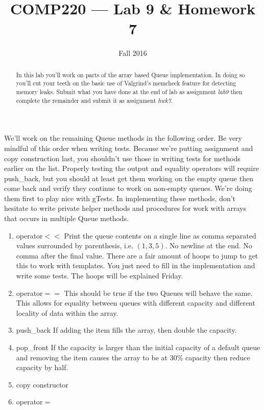 \documentclass[10pt]{article}
\title{COMP220 --- Lab 9 \& Homework 7}
\author{ }
\date{Fall 2016}
\begin{document}
\maketitle


\begin{abstract}
In this lab you'll work on parts of the array based Queue implementation. In doing so you'll cut your teeth on the basic use of Valgrind's memcheck feature for detecting memory leaks. Submit what you have done at the end of lab as assignment \textit{lab9} then complete the remainder and submit it as assignment \textit{hwk7}.
\end{abstract}

We'll work on the remaining Queue methods in the following order. Be very mindful of this order when writing tests. Because we're putting assignment and copy construction last, you shouldn't use those in writing tests for methods earlier on the list. Properly testing the output and equality operators will require push\_back, but you should at least get them working on the empty queue then come back and verify they continue to work on non-empty queues. We're doing them first to play nice with gTests. In implementing these methods, don't hesitate to write private helper methods and procedures for work with arrays that occurs in multiple Queue methods.

\begin{enumerate}
  \item operator$<<$ \newline
    Print the queue contents on a single line as comma separated values surrounded by parenthesis, i.e. $(1,3,5)$. No newline at the end. No comma after the final value. There are a fair amount of hoops to jump to get this to work with templates. You just need to fill in the implementation and write some tests. The hoops will be explained Friday.
  \item operator$==$ \newline
    This should be true if the two Queues will behave the same. This allows for equality between queues with different capacity and different locality of data within the array.
  \item push\_back \newline
      If adding the item fills the array, then double the capacity.
  \item pop\_front
    If the capacity is larger than the initial capacity of a default queue and removing the item causes the array to be at 30\% capacity then reduce capacity by half.
  \item copy constructor
  \item operator$=$
\end{enumerate}
\end{document}
